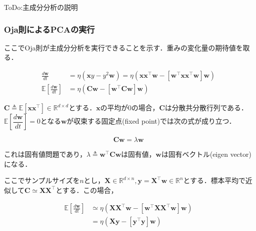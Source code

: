 ToDo:主成分分析の説明




\subsubsection{Oja則によるPCAの実行}
ここでOja則が主成分分析を実行できることを示す．重みの変化量の期待値を取る．


\begin{align}
\frac{d\mathbf{w}}{dt} &= \eta \left(\mathbf{x}y - y^2 \mathbf{w}\right)=\eta \left(\mathbf{x}\mathbf{x}^\top \mathbf{w} - \left[\mathbf{w}^\top \mathbf{x}\mathbf{x}^\top \mathbf{w}\right] \mathbf{w}\right)\\
\mathbb{E}\left[\frac{d\mathbf{w}}{dt}\right] &= \eta \left(\mathbf{C} \mathbf{w} - \left[\mathbf{w}^\top \mathbf{C} \mathbf{w}\right] \mathbf{w}\right)
\end{align}


$\mathbf{C}\triangleq\mathbb{E}[\mathbf{x}\mathbf{x}^\top]\in \mathbb{R}^{d\times d}$とする．$\mathbf{x}$の平均が0の場合，$\mathbf{C}$は分散共分散行列である．$\mathbb{E}\left[\dfrac{d\mathbf{w}}{dt}\right]=0$となる$\mathbf{w}$が収束する固定点(fixed point)では次の式が成り立つ．


\begin{equation}
\mathbf{C}\mathbf{w} = \lambda \mathbf{w}
\end{equation}


これは固有値問題であり，$\lambda\triangleq\mathbf{w}^\top \mathbf{C} \mathbf{w}$は固有値，$\mathbf{w}$は固有ベクトル(eigen vector)になる．

ここでサンプルサイズを$n$とし，$\mathbf{X} \in \mathbb{R}^{d\times n}, \mathbf{y}=\mathbf{X}^\top\mathbf{w} \in \mathbb{R}^n$とする．標本平均で近似して$\mathbf{C}\simeq \mathbf{X}\mathbf{X}^\top$とする．この場合，


\begin{align}
\mathbb{E}\left[\frac{d\mathbf{w}}{dt}\right] &\simeq \eta \left(\mathbf{X}\mathbf{X}^\top \mathbf{w} - \left[\mathbf{w}^\top \mathbf{X}\mathbf{X}^\top \mathbf{w}\right] \mathbf{w}\right)\\
&=\eta \left(\mathbf{X}\mathbf{y} - \left[\mathbf{y}^\top\mathbf{y}\right] \mathbf{w}\right)
\end{align}


